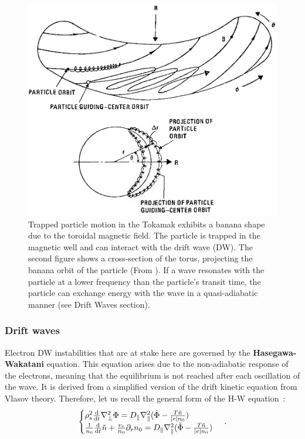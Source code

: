 \documentclass[11pt,openany]{report}
\begin{document}
\begin{multicols}{2}

    \begin{figure}[H]
        \centering
        \includegraphics[width=1\linewidth]{./figures/banana.png}
        \caption{Trapped particle motion in the Tokamak exhibits a banana shape due to the toroidal magnetic field. The particle is trapped in the magnetic well and can interact with the drift wave (DW). The second figure shows a cross-section of the torus, projecting the banana orbit of the particle (From \cite{book_banana, Banana_distr_runaway}). If a wave resonates with the particle at a lower frequency than the particle's transit time, the particle can exchange energy with the wave in a quasi-adiabatic manner (see Drift Waves section).}
        \label{}
    \end{figure}


    \subsubsection{Drift waves}
    Electron DW instabilities that are at stake here are governed by the \textbf{Hasegawa-Wakatani} \cite{Hasegawa,Wakatani} equation. This equation arises due to the non-adiabatic response of the electrons, meaning that the equilibrium is not reached after each oscillation of the wave. It is derived from a simplified version of the drift kinetic equation from Vlasov theory. Therefore, let us recall the general form of the H-W equation~:
    \begin{equation}
        \begin{cases}
            \rho_s^2
            \dv{t}\nabla_\perp^2 \Phi= D_\parallel\nabla_\parallel^2(\tilde{\Phi} - \frac{T\tilde{n}}{|e|n_0}) \\
            \frac{1}{n_0}\dv{t}\tilde{n} + \frac{v_r}{n_0}\partial_r n_0 = D_\parallel\nabla_\parallel^2(\tilde{\Phi} - \frac{T\tilde{n}}{|e|n_0})
        \end{cases}\,.
    \end{equation}


\end{multicols}
\end{document}
